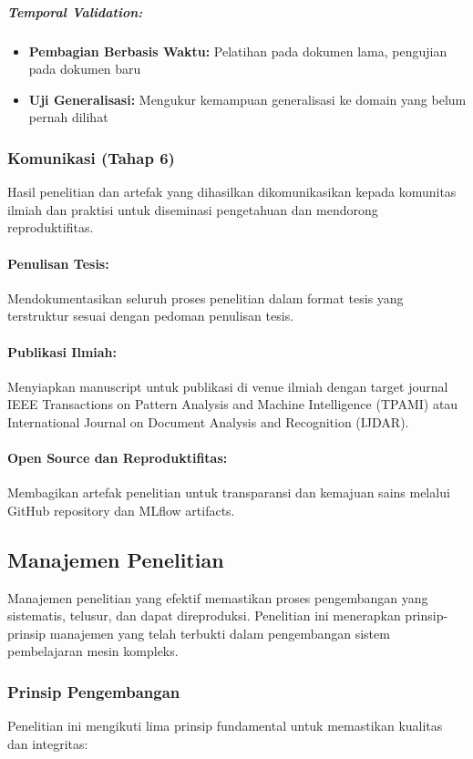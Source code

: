 \documentclass[12pt,a4paper]{article}
\begin{document}
\subparagraph{Temporal Validation:}
\begin{itemize}[leftmargin=*, nosep]
\item \textbf{Pembagian Berbasis Waktu:} Pelatihan pada dokumen lama, pengujian pada dokumen baru
\item \textbf{Uji Generalisasi:} Mengukur kemampuan generalisasi ke domain yang belum pernah dilihat
\end{itemize}

\subsubsection{Komunikasi (Tahap 6)}
Hasil penelitian dan artefak yang dihasilkan dikomunikasikan kepada komunitas ilmiah dan praktisi untuk diseminasi pengetahuan dan mendorong reproduktifitas.

\paragraph{Penulisan Tesis:}
Mendokumentasikan seluruh proses penelitian dalam format tesis yang terstruktur sesuai dengan pedoman penulisan tesis.

\paragraph{Publikasi Ilmiah:}
Menyiapkan manuscript untuk publikasi di venue ilmiah dengan target journal IEEE Transactions on Pattern Analysis and Machine Intelligence (TPAMI) atau International Journal on Document Analysis and Recognition (IJDAR).

\paragraph{Open Source dan Reproduktifitas:}
Membagikan artefak penelitian untuk transparansi dan kemajuan sains melalui GitHub repository dan MLflow artifacts.

\subsection{Manajemen Penelitian}
\label{subsec:manajemen-penelitian}

Manajemen penelitian yang efektif memastikan proses pengembangan yang sistematis, telusur, dan dapat direproduksi. Penelitian ini menerapkan prinsip-prinsip manajemen yang telah terbukti dalam pengembangan sistem pembelajaran mesin kompleks.

\subsubsection{Prinsip Pengembangan}
Penelitian ini mengikuti lima prinsip fundamental untuk memastikan kualitas dan integritas:
\end{document}
